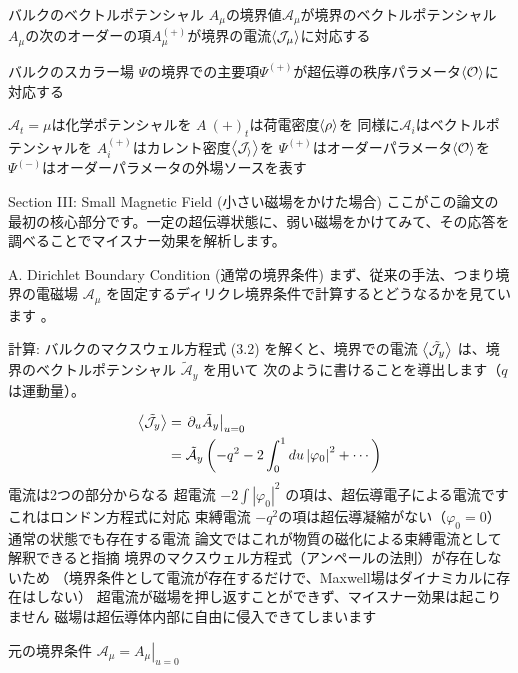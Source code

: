 \documentclass[b5paper,11pt,dvipdfmx]{jsarticle}
\numberwithin{equation}{section}
\theoremstyle{definition}
\begin{document}
バルクのベクトルポテンシャル
$A_\mu$の境界値$\mathcal{A}_\mu$が境界のベクトルポテンシャル
$A_\mu$の次のオーダーの項$A_\mu^{(+)}$が境界の電流$\ev{\mathcal{J}_\mu}$に対応する



バルクのスカラー場
$\Psi$の境界での主要項$\Psi^{(+)}$が超伝導の秩序パラメータ$\ev{\mathcal{O}}$に対応する


$\mathcal{A}_t = \mu$は化学ポテンシャルを
$A~{(+)}_t$は荷電密度$\ev{\rho}$を
同様に$\mathcal{A}_i$はベクトルポテンシャルを
$A^{(+)}_i$はカレント密度$\ev{\mathcal{J_i}}$を
$\Psi^{(+)}$はオーダーパラメータ$\ev{\mathcal{O}}$を
$\Psi^{(-)}$はオーダーパラメータの外場ソースを表す



Section III: Small Magnetic Field (小さい磁場をかけた場合)
ここがこの論文の最初の核心部分です。一定の超伝導状態に、弱い磁場をかけてみて、その応答を調べることでマイスナー効果を解析します。

A. Dirichlet Boundary Condition (通常の境界条件)
まず、従来の手法、つまり境界の電磁場
$\mathcal{A}_\mu$ を固定するディリクレ境界条件で計算するとどうなるかを見ています 。


計算: バルクのマクスウェル方程式 (3.2)  を解くと、境界での電流
$\ev{\tilde{\mathcal{J}}_y}$ は、境界のベクトルポテンシャル $\tilde{\mathcal{A}}_y$ を用いて
次のように書けることを導出します（$q$ は運動量）。

\begin{equation}
    \begin{split}
        \ev{\tilde{\mathcal{J}}_y}& =\left.\partial_u \tilde{A}_y\right|_{u=0} \\
        & =\tilde{\mathcal{A}}_y\left(-q^2-2 \int_0^1 d u\left|\varphi_0\right|^2+\cdots\right)
    \end{split}
\end{equation}
電流は2つの部分からなる
超電流
$-2\int |\varphi_0|^2$ の項は、超伝導電子による電流ですこれはロンドン方程式に対応
束縛電流
$-q^2$の項は超伝導凝縮がない（$\varphi_0=0$）通常の状態でも存在する電流
論文ではこれが物質の磁化による束縛電流として解釈できると指摘
境界のマクスウェル方程式（アンペールの法則）が存在しないため
（境界条件として電流が存在するだけで、Maxwell場はダイナミカルに存在はしない）
超電流が磁場を押し返すことができず、マイスナー効果は起こりません
磁場は超伝導体内部に自由に侵入できてしまいます

元の境界条件
$\mathcal{A}_\mu = \left. A_\mu \right|_{u = 0}$
\end{document}

